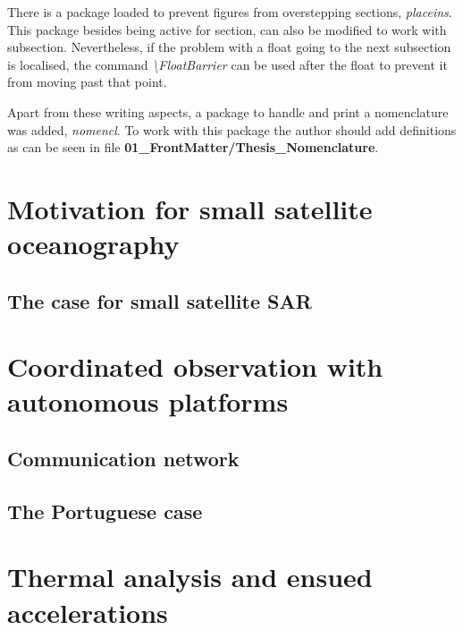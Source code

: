 There is a package loaded to prevent figures from overstepping sections, \emph{placeins}.
This package besides being active for section, can also be modified to work with subsection.
Nevertheless, if the problem with a float going to the next subsection is localised, the command \emph{\textbackslash{}FloatBarrier} can be used after the float to prevent it from moving past that point.

Apart from these writing aspects, a package to handle and print a nomenclature was added, \emph{nomencl}.
To work with this package the author should add definitions as can be seen in file \textbf{01\_FrontMatter/Thesis\_Nomenclature}.


\section{Motivation for small satellite oceanography}
\label{sec:Intro_Motivation}

\lipsum

\subsection{The case for small satellite SAR}

\lipsum


\section{Coordinated observation with autonomous platforms}
\label{sec:Intro_CoordinatedObeservation}

\lipsum

\subsection{Communication network}
\label{sec:Intro_CommNetwork}

\lipsum

\subsection{The Portuguese case}
\label{sec:Intro_Portugal}

\lipsum


\section{Thermal analysis and ensued accelerations}
\label{sec:Intro_Thermal}

\lipsum


